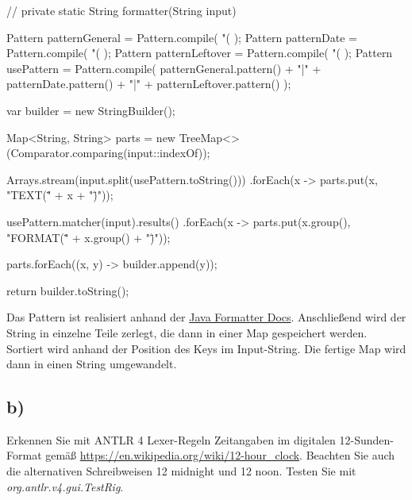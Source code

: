 \begin{code}[language=java, caption={Funktion für Date/Time Formatter}, label={lst:Aufgabe1a}]//
private static String formatter(String input) {
    Pattern patternGeneral =
            Pattern.compile(
                    "(%
            );
    Pattern patternDate =
            Pattern.compile(
                    "(%
            );
    Pattern patternLeftover =
            Pattern.compile(
                    "(%
            );
    Pattern usePattern = Pattern.compile(
            patternGeneral.pattern()
                    + "|" + patternDate.pattern()
                    + "|" + patternLeftover.pattern()
    );

    var builder = new StringBuilder();

    Map<String, String> parts = new TreeMap<>(Comparator.comparing(input::indexOf));

    Arrays.stream(input.split(usePattern.toString()))
            .forEach(x -> parts.put(x, "TEXT(\"" + x + "\")"));

    usePattern.matcher(input).results()
            .forEach(x -> parts.put(x.group(), "FORMAT(\"" + x.group() + "\")"));

    parts.forEach((x, y) -> builder.append(y));

    return builder.toString();
}
\end{code}

Das Pattern ist realisiert anhand der \href{https://docs.oracle.com/javase/7/docs/api/java/util/Formatter.html}{Java Formatter Docs}. \newline
Anschließend wird der String in einzelne Teile zerlegt, die dann in einer Map gespeichert werden.
Sortiert wird anhand der Position des Keys im Input-String. \newline
Die fertige Map wird dann in einen String umgewandelt. \newline

\newpage

\subsection*{b)}
Erkennen Sie mit ANTLR 4 Lexer-Regeln Zeitangaben im digitalen 12-Sunden-Format gemäß \url{https://en.wikipedia.org/wiki/12-hour_clock}.
Beachten Sie auch die alternativen Schreibweisen 12 midnight und 12 noon. Testen Sie mit \textit{org.antlr.v4.gui.TestRig}.

